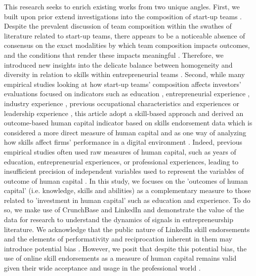 \documentclass[12pt]{article}
\begin{document}
This research seeks to enrich existing works from two unique angles. First, we built upon prior extend investigations into the composition of start-up teams \citep{beckman2007early, jung2017entrepreneurial}. Despite the prevalent discussion of team composition within the swathes of literature related to start-up teams, there appears to be a noticeable absence of consensus on the exact modalities by which team composition impacts outcomes, and the conditions that render these impacts meaningful \citep{klotz2014new, zhou2015entrepreneurial}. Therefore, we introduced new insights into the delicate balance between homogeneity and diversity in relation to skills within entrepreneurial teams \citep{sundermeier2022entrepreneurial, villani2018entrepreneurial}. Second, while many empirical studies looking at how start-up teams' composition affects investors' evaluations focused on indicators such as education \citep{franke2008venture}, entrepreneurial experience \citep{beckman2007early, fuentelsaz2023entrepreneurial}, industry experience \citep{becker2015new}, previous occupational characteristics and experiences \citep{wu2023secrets} or leadership experience \citep{hoenig2015quality}, this article adopt a skill-based approach and derived an outcome-based human capital indicator based on skills endorsement data which is considered a more direct measure of human capital and as one way of analyzing how skills affect firms' performance in a digital environment \citep{colombo2021use, drover2017review, klein2020start, marvel2016human}. Indeed, previous empirical studies often used raw measures of human capital, such as years of education, entrepreneurial experiences, or professional experiences, leading to insufficient precision of independent variables used to represent the variables of outcome of human capital \citep{harrison2007s}. In this study, we focuses on the 'outcomes of human capital' (i.e. knowledge, skills and abilities) as a complementary measure to those related to 'investment in human capital' such as education and experience. To do so, we make use of CrunchBase and LinkedIn and demonstrate the value of the data for research to understand the dynamics of signals in entrepreneurship literature. We acknowledge that the public nature of LinkedIn skill endorsements and the elements of performativity and reciprocation inherent in them may introduce potential bias \citep{perez2016endorsement}. However, we posit that despite this potential bias, the use of online skill endorsements as a measure of human capital remains valid given their wide acceptance and usage in the professional world \citep{perez2016endorsement, gasiorowski2022pay}.
\end{document}
